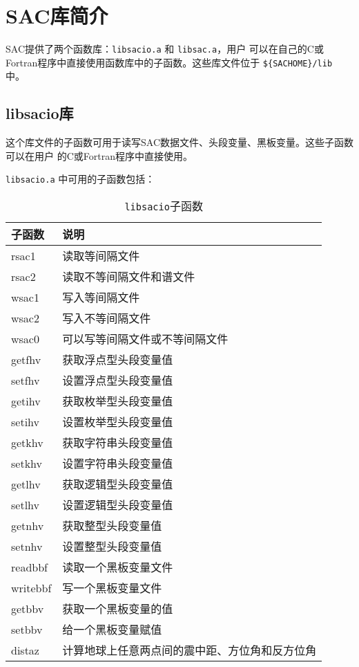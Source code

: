 \section{SAC库简介}
SAC提供了两个函数库：\texttt{libsacio.a} 和 \texttt{libsac.a}，用户
可以在自己的C或Fortran程序中直接使用函数库中的子函数。这些库文件位于
\verb|${SACHOME}/lib| 中。

\subsection{libsacio库}
这个库文件的子函数可用于读写SAC数据文件、头段变量、黑板变量。这些子函数可以在用户
的C或Fortran程序中直接使用。

\texttt{libsacio.a} 中可用的子函数包括：
\begin{table}[H]
\centering
\caption{\texttt{libsacio}子函数}
\ttfamily
\begin{tabular}{ll}
\toprule
子函数      &       说明            \\
\midrule
rsac1       &       读取等间隔文件  \\
rsac2       &       读取不等间隔文件和谱文件    \\
wsac1       &       写入等间隔文件  \\
wsac2       &       写入不等间隔文件    \\
wsac0       &       可以写等间隔文件或不等间隔文件  \\
getfhv      &       获取浮点型头段变量值    \\
setfhv      &       设置浮点型头段变量值    \\
getihv      &       获取枚举型头段变量值    \\
setihv      &       设置枚举型头段变量值    \\
getkhv      &       获取字符串头段变量值    \\
setkhv      &       设置字符串头段变量值    \\
getlhv      &       获取逻辑型头段变量值    \\
setlhv      &       设置逻辑型头段变量值    \\
getnhv      &       获取整型头段变量值      \\
setnhv      &       设置整型头段变量值  \\
readbbf     &       读取一个黑板变量文件    \\
writebbf    &       写一个黑板变量文件      \\
getbbv      &       获取一个黑板变量的值    \\
setbbv      &       给一个黑板变量赋值      \\
distaz      &       计算地球上任意两点间的震中距、方位角和反方位角  \\
\bottomrule
\end{tabular}
\end{table}

